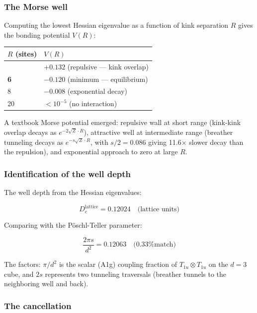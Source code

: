 \documentclass[
]{article}
\newcounter{none} %
\begin{document}
\subsubsection{The Morse well}\label{the-morse-well}

Computing the lowest Hessian eigenvalue as a function of kink separation
\(R\) gives the bonding potential \(V(R)\):

{\def\LTcaptype{none} %
\begin{longtable}[]{@{}ll@{}}
\toprule\noalign{}
\(R\) (sites) & \(V(R)\) \\
\midrule\noalign{}
\endhead
\bottomrule\noalign{}
\endlastfoot
4 & \(+0.132\) (repulsive --- kink overlap) \\
\textbf{6} & \textbf{\(-0.120\)} (minimum --- equilibrium) \\
8 & \(-0.008\) (exponential decay) \\
20 & \(< 10^{-5}\) (no interaction) \\
\end{longtable}
}

A textbook Morse potential emerged: repulsive wall at short range
(kink-kink overlap decays as \(e^{-2\sqrt{Z}\cdot R}\)), attractive well
at intermediate range (breather tunneling decays as
\(e^{-s\sqrt{Z}\cdot R}\), with \(s/2 = 0.086\) giving 11.6\(\times\)
slower decay than the repulsion), and exponential approach to zero at
large \(R\).

\subsubsection{Identification of the well
depth}\label{identification-of-the-well-depth}

The well depth from the Hessian eigenvalues:

\[D_e^{\text{lattice}} = 0.12024 \quad\text{(lattice units)}\]

Comparing with the Pöschl-Teller parameter:

\[\frac{2\pi s}{d^2} = 0.12063 \quad\text{(0.33\% match)}\]

The factors: \(\pi/d^2\) is the scalar (A1g) coupling fraction of
\(T_{1u} \otimes T_{1u}\) on the \(d=3\) cube, and \(2s\) represents two
tunneling traversals (breather tunnels to the neighboring well and
back).

\subsubsection{The cancellation}\label{the-cancellation}
\end{document}
